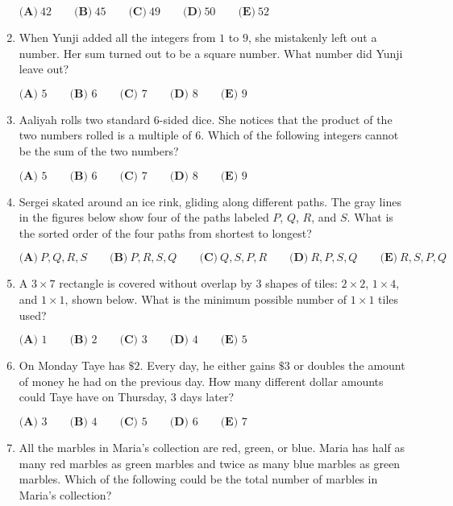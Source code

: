 \documentclass{article}
\begin{document}
\begin{enumerate}[label=\arabic*., itemsep=0.5em]
\(\textbf{(A)}\ 42 \qquad \textbf{(B)}\ 45\qquad \textbf{(C)}\ 49\qquad \textbf{(D)}\ 50\qquad \textbf{(E)}\ 52\)\par \vspace{0.5em}\item When Yunji added all the integers from \(1\) to \(9\), she mistakenly left out a number. Her sum turned out to be a square number. What number did Yunji leave out?

\(\textbf{(A) } 5\qquad\textbf{(B) } 6\qquad\textbf{(C) } 7\qquad\textbf{(D) } 8\qquad\textbf{(E) } 9\)\par \vspace{0.5em}\item Aaliyah rolls two standard 6-sided dice. She notices that the product of the two numbers rolled is a multiple of \(6\). Which of the following integers cannot be the sum of the two numbers?

\(\textbf{(A) } 5\qquad\textbf{(B) } 6\qquad\textbf{(C) } 7\qquad\textbf{(D) } 8\qquad\textbf{(E) } 9\)\par \vspace{0.5em}\item Sergei skated around an ice rink, gliding along different paths. The gray lines in the figures below show four of the paths labeled \(P\), \(Q\), \(R\), and \(S\). What is the sorted order of the four paths from shortest to longest?



\(\textbf{(A)}\ P,Q,R,S \qquad \textbf{(B)}\ P,R,S,Q \qquad \textbf{(C)}\ Q,S,P,R \qquad \textbf{(D)}\ R,P,S,Q \qquad \textbf{(E)}\ R,S,P,Q\)\par \vspace{0.5em}\item A \(3\times 7\) rectangle is covered without overlap by 3 shapes of tiles: \(2\times 2\), \(1\times 4\), and \(1\times 1\), shown below. What is the minimum possible number of \(1\times 1\) tiles used?



\(\textbf{(A) } 1\qquad\textbf{(B) } 2\qquad\textbf{(C) } 3\qquad\textbf{(D) } 4\qquad\textbf{(E) } 5\)\par \vspace{0.5em}\item On Monday Taye has \(\$2\). Every day, he either gains \(\$3\) or doubles the amount of money he had on the previous day. How many different dollar amounts could Taye have on Thursday, \(3\) days later?

\(\textbf{(A) } 3\qquad\textbf{(B) } 4\qquad\textbf{(C) } 5\qquad\textbf{(D) } 6\qquad\textbf{(E) } 7\)\par \vspace{0.5em}\item All the marbles in Maria's collection are red, green, or blue. Maria has half as many red marbles as green marbles and twice as many blue marbles as green marbles. Which of the following could be the total number of marbles in Maria's collection?


\end{enumerate}
\end{document}
